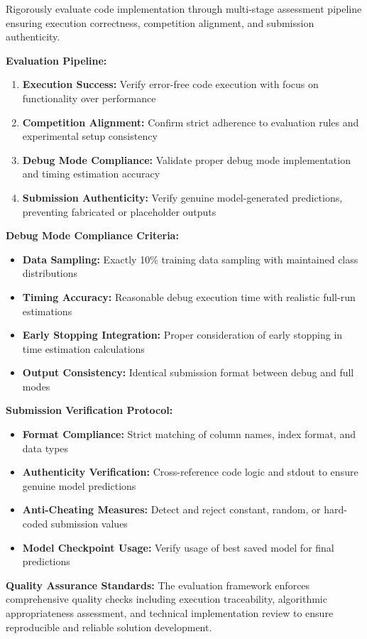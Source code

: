 \begin{tcolorbox}[
  colback=gray!5,
  colframe=gray!80,
  title=Systematic Code Evaluation Framework –--- Coding Workflow Component,
  breakable
]
Rigorously evaluate code implementation through multi-stage assessment pipeline ensuring execution correctness, competition alignment, and submission authenticity.

\textbf{Evaluation Pipeline:}
\begin{enumerate}
    \item \textbf{Execution Success:} Verify error-free code execution with focus on functionality over performance
    \item \textbf{Competition Alignment:} Confirm strict adherence to evaluation rules and experimental setup consistency
    \item \textbf{Debug Mode Compliance:} Validate proper debug mode implementation and timing estimation accuracy
    \item \textbf{Submission Authenticity:} Verify genuine model-generated predictions, preventing fabricated or placeholder outputs
\end{enumerate}

\textbf{Debug Mode Compliance Criteria:}
\begin{itemize}
    \item \textbf{Data Sampling:} Exactly 10\% training data sampling with maintained class distributions
    \item \textbf{Timing Accuracy:} Reasonable debug execution time with realistic full-run estimations
    \item \textbf{Early Stopping Integration:} Proper consideration of early stopping in time estimation calculations
    \item \textbf{Output Consistency:} Identical submission format between debug and full modes
\end{itemize}

\textbf{Submission Verification Protocol:}
\begin{itemize}
    \item \textbf{Format Compliance:} Strict matching of column names, index format, and data types
    \item \textbf{Authenticity Verification:} Cross-reference code logic and stdout to ensure genuine model predictions
    \item \textbf{Anti-Cheating Measures:} Detect and reject constant, random, or hard-coded submission values
    \item \textbf{Model Checkpoint Usage:} Verify usage of best saved model for final predictions
\end{itemize}

\textbf{Quality Assurance Standards:}
The evaluation framework enforces comprehensive quality checks including execution traceability, algorithmic appropriateness assessment, and technical implementation review to ensure reproducible and reliable solution development.
\end{tcolorbox}


